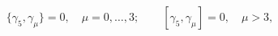 \begin{equation}
\{\gamma_5,\gamma_\mu\}=0,\quad \mu=0,\ldots,3;\qquad
[\gamma_5,\gamma_\mu]=0,\quad \mu>3,
\end{equation}

